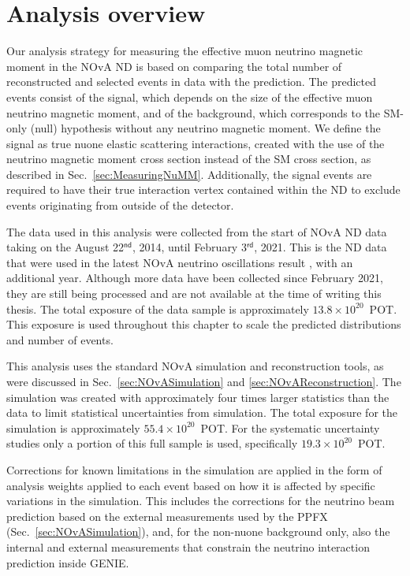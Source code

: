 \section{Analysis overview}\label{sec:NuMMAnalysisOverview}

Our analysis strategy for measuring the effective muon neutrino magnetic moment in the \gls{NOvA} \gls{ND} is based on comparing the total number of reconstructed and selected events in data with the prediction. The predicted events consist of the signal, which depends on the size of the effective muon neutrino magnetic moment, and of the background, which corresponds to the \gls{SM}-only (null) hypothesis without any neutrino magnetic moment. We define the signal as true \gls{nuone} elastic scattering interactions, created with the use of the neutrino magnetic moment cross section instead of the \gls{SM} cross section, as described in Sec.~\ref{sec:MeasuringNuMM}. Additionally, the signal events are required to have their true interaction vertex contained within the \gls{ND} to exclude events originating from outside of the detector.

The data used in this analysis were collected from the start of \gls{NOvA} \gls{ND} data taking on the August 22$^{\textsf{nd}}$, 2014, until February 3$^{\textsf{rd}}$, 2021. This is the \gls{ND} data that were used in the latest \gls{NOvA} neutrino oscillations result \cite{NOvAResults2021.pdf}, with an additional year. Although more data have been collected since February 2021, they are still being processed and are not available at the time of writing this thesis. The total exposure of the data sample is approximately $13.8\times10^{20}$~\gls{POT}. This exposure is used throughout this chapter to scale the predicted distributions and number of events.

This analysis uses the standard \gls{NOvA} simulation and reconstruction tools, as were discussed in Sec.~\ref{sec:NOvASimulation} and \ref{sec:NOvAReconstruction}. The simulation was created with approximately four times larger statistics than the data to limit statistical uncertainties from simulation. The total exposure for the simulation is approximately $55.4\times10^{20}$~\gls{POT}. For the systematic uncertainty studies only a portion of this full sample is used, specifically $19.3\times10^{20}$~\gls{POT}.

Corrections for known limitations in the simulation are applied in the form of analysis weights applied to each event based on how it is affected by specific variations in the simulation. This includes the corrections for the neutrino beam prediction based on the external measurements used by the \gls{PPFX} (Sec.~\ref{sec:NOvASimulation}), and, for the non-\gls{nuone} background only, also the internal and external measurements that constrain the neutrino interaction prediction inside GENIE.

